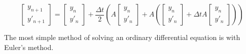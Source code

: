 \documentclass{article}
\begin{document}
\begin{equation}
    \begin{bmatrix}
        y_{n+1} \\ y'_{n+1}
    \end{bmatrix} = 
    \begin{bmatrix}
        y_n \\ y'_n
    \end{bmatrix} + \frac{\Delta t}{2} \left(A \begin{bmatrix}
        y_n \\ y'_n
    \end{bmatrix}+A\left(\begin{bmatrix}
        y_n \\ y'_n
    \end{bmatrix} + \Delta t A \begin{bmatrix}
        y_n \\ y'_n
    \end{bmatrix}\right)\right)
    \label{eq:}
\end{equation}



The most simple method of solving an ordinary differential equation is with Euler's method.
\end{document}
